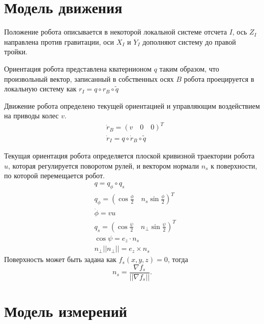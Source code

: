 \documentclass[a4paper,12pt]{article}
\begin{document}
\section{Модель движения}

Положение робота описывается в некоторой локальной системе отсчета $I$, ось $Z_I$ направлена против гравитации, оси $X_I$ и $Y_I$ дополняют систему до правой тройки.

Ориентация робота представлена кватернионом $q$ таким образом, что произвольный вектор, записанный в собственных осях $B$ робота проецируется в локальную систему как
$r_I = q \circ r_B \circ \tilde{q}$

Движение робота определено текущей ориентацией и управляющим воздействием на приводы колес $v$.
\begin{align*} 
&\dot{r}_B = (v \quad 0 \quad 0)^T \\
&\dot{r}_I = q \circ \dot{r}_B \circ \tilde{q}
\end{align*}

Текущая ориентация робота определяется плоской кривизной траектории робота $u$, которая регулируется поворотом рулей, и вектором нормали $n_s$ к поверхности, по которой перемещается робот.
\begin{align*} 
&q = q_{\phi} \circ q_{s} \\
&q_{\phi} = (\cos{\frac{\phi}{2}} \quad n_{s}\sin{\frac{\phi}{2}})^T \\
&\dot{\phi} = vu \\
&q_{s} = (\cos{\frac{\psi}{2}} \quad n_{\perp}\sin{\frac{\psi}{2}})^T \\
&\cos{\psi} = e_z \cdot n_s \\
& n_{\perp} ||n_{\perp}|| = e_z \times n_s 
\end{align*}
Поверхность может быть задана как $f_s(x,y,z) = 0$,
тогда 
$$n_s = \frac{\nabla f_s}{||\nabla f_s||}.$$

\section{Модель измерений}
	
\end{document}
